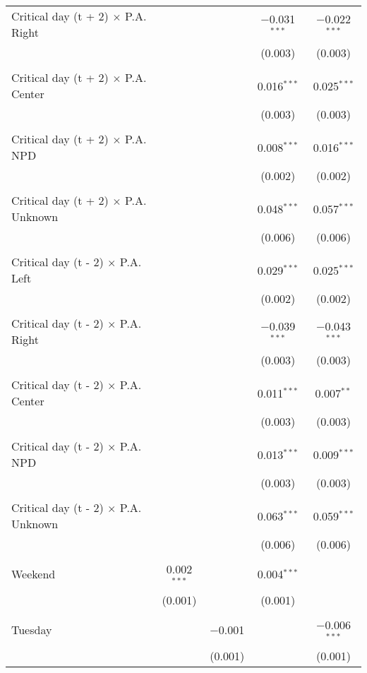 \documentclass[
]{article}
\begin{document}
\begin{table}[!htbp]
{\begin{tabular}{@{\extracolsep{5pt}}lcccc}
 Critical day (t + 2) $\times$ P.A. Right &  &  & $-$0.031$^{***}$ & $-$0.022$^{***}$ \\ 
  &  &  & (0.003) & (0.003) \\ 
  & & & & \\ 
 Critical day (t + 2) $\times$ P.A. Center &  &  & 0.016$^{***}$ & 0.025$^{***}$ \\ 
  &  &  & (0.003) & (0.003) \\ 
  & & & & \\ 
 Critical day (t + 2) $\times$ P.A. NPD &  &  & 0.008$^{***}$ & 0.016$^{***}$ \\ 
  &  &  & (0.002) & (0.002) \\ 
  & & & & \\ 
 Critical day (t + 2) $\times$ P.A. Unknown &  &  & 0.048$^{***}$ & 0.057$^{***}$ \\ 
  &  &  & (0.006) & (0.006) \\ 
  & & & & \\ 
 Critical day (t - 2) $\times$ P.A. Left &  &  & 0.029$^{***}$ & 0.025$^{***}$ \\ 
  &  &  & (0.002) & (0.002) \\ 
  & & & & \\ 
 Critical day (t - 2) $\times$ P.A. Right &  &  & $-$0.039$^{***}$ & $-$0.043$^{***}$ \\ 
  &  &  & (0.003) & (0.003) \\ 
  & & & & \\ 
 Critical day (t - 2) $\times$ P.A. Center &  &  & 0.011$^{***}$ & 0.007$^{**}$ \\ 
  &  &  & (0.003) & (0.003) \\ 
  & & & & \\ 
 Critical day (t - 2) $\times$ P.A. NPD &  &  & 0.013$^{***}$ & 0.009$^{***}$ \\ 
  &  &  & (0.003) & (0.003) \\ 
  & & & & \\ 
 Critical day (t - 2) $\times$ P.A. Unknown &  &  & 0.063$^{***}$ & 0.059$^{***}$ \\ 
  &  &  & (0.006) & (0.006) \\ 
  & & & & \\ 
 Weekend & 0.002$^{***}$ &  & 0.004$^{***}$ &  \\ 
  & (0.001) &  & (0.001) &  \\ 
  & & & & \\ 
 Tuesday &  & $-$0.001 &  & $-$0.006$^{***}$ \\ 
  &  & (0.001) &  & (0.001) \\ 

\end{tabular}}
\end{table}
\end{document}
